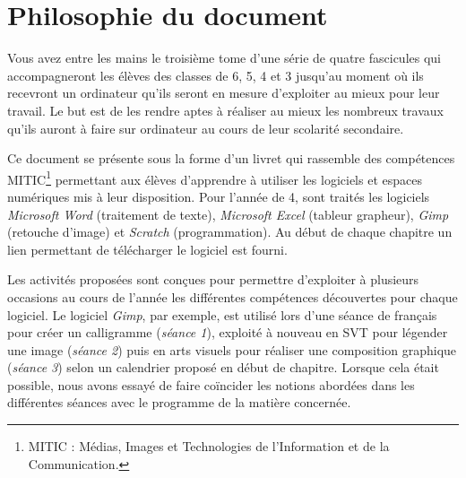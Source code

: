 \chapter*{Philosophie du document}



Vous avez entre les mains le troisième tome d'une série de quatre fascicules qui accompagneront les élèves des classes de 6, 5, 4 et 3 jusqu'au moment où ils recevront un ordinateur qu'ils seront en mesure d'exploiter au mieux pour leur travail. Le but est de les rendre aptes à réaliser au mieux les nombreux travaux qu'ils auront à faire sur ordinateur au cours de leur scolarité secondaire.

\vspace{18pt}

Ce document se présente sous la forme d'un livret qui rassemble des compétences MITIC\footnote{MITIC : Médias, Images et Technologies de l'Information et de la Communication.} permettant aux élèves d'apprendre à utiliser les logiciels et espaces numériques mis à leur disposition. Pour l'année de 4, sont traités les logiciels \emph{Microsoft Word} (traitement de texte), \emph{Microsoft Excel} (tableur grapheur), \emph{Gimp} (retouche d'image) et \emph{Scratch} (programmation). Au début de chaque chapitre un lien permettant de télécharger le logiciel est fourni.

\vspace{18pt}

Les activités proposées sont conçues pour permettre d'exploiter à plusieurs occasions au cours de l'année les différentes compétences découvertes pour chaque logiciel. Le logiciel \emph{Gimp}, par exemple, est utilisé lors d'une séance de français pour créer un calligramme (\emph{séance 1}), exploité à nouveau en SVT pour légender une image (\emph{séance 2}) puis en arts visuels pour réaliser une composition graphique (\emph{séance 3}) selon un calendrier proposé en début de chapitre. Lorsque cela était possible, nous avons essayé de faire coïncider les notions abordées dans les différentes séances avec le programme de la matière concernée.


